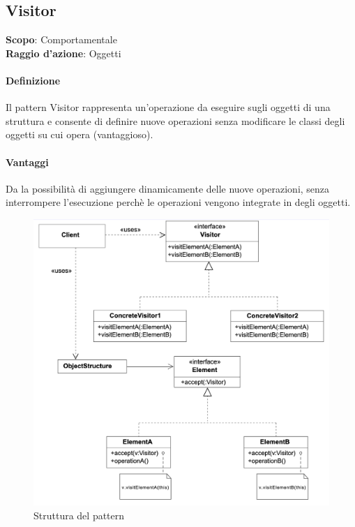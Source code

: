 \subsection{Visitor}
\label{visitor}

\textbf{Scopo}: Comportamentale \\
\textbf{Raggio d'azione}: Oggetti

\paragraph{Definizione} Il pattern Visitor rappresenta un’operazione da eseguire sugli oggetti di una struttura e consente di definire nuove operazioni senza modificare le classi degli oggetti su cui opera (vantaggioso).

\paragraph{Vantaggi} Da la possibilità di aggiungere dinamicamente delle nuove operazioni, senza interrompere l'esecuzione perchè le operazioni vengono integrate in degli oggetti.

\begin{figure}[H]
    \centering
    \includegraphics[width=1\linewidth]{assets/pattern/visitor/visitor-struttura.png}
    \caption{Struttura del pattern}
\end{figure}

